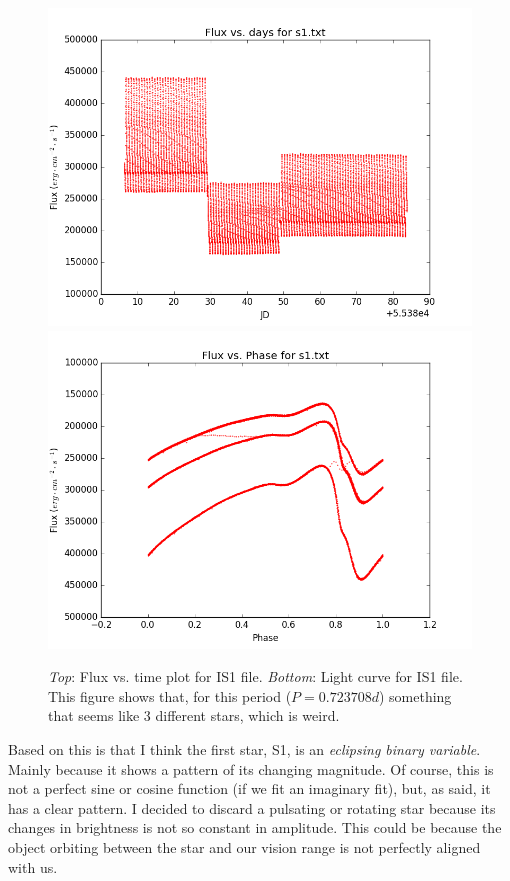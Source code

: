 \begin{enumerate} [a)]
\begin{figure}[tb]
\centering
\includegraphics[scale=0.5]{s1txt_simple_plot.png}
\includegraphics[scale=0.5]{s1txt_phase_plot.png}
\caption{\textit{Top}: Flux vs. time plot for IS1 file. \textit{Bottom}: Light curve for IS1 file. This figure shows that, for this period ($P =0.723708 d$) something that seems like 3 different stars, which is weird.}
\label{fig:F1}
\end{figure}


Based on this is that I think the first star, S1, is an \emph{eclipsing binary variable}. Mainly because it shows a pattern of its changing magnitude. Of course, this is not a perfect sine or cosine function (if we fit an imaginary fit), but, as said, it has a clear pattern. I decided to discard a pulsating or rotating star because its changes in brightness is not so constant in amplitude. This could be because the object orbiting between the star and our vision range is not perfectly aligned with us.


\end{enumerate}
